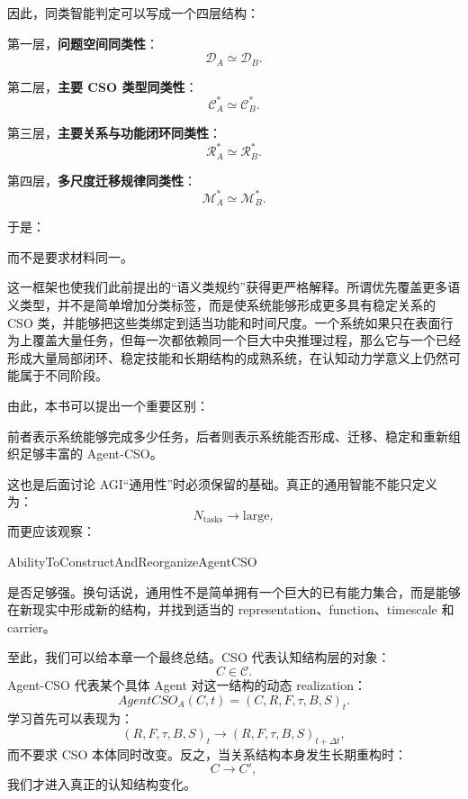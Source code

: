 因此，同类智能判定可以写成一个四层结构：

第一层，\textbf{问题空间同类性}：
\[
\mathcal D_A
\simeq
\mathcal D_B.
\]

第二层，\textbf{主要 CSO 类型同类性}：
\[
\mathcal C_A^\ast
\simeq
\mathcal C_B^\ast.
\]

第三层，\textbf{主要关系与功能闭环同类性}：
\[
\mathcal R_A^\ast
\simeq
\mathcal R_B^\ast.
\]

第四层，\textbf{多尺度迁移规律同类性}：
\[
\mathcal M_A^\ast
\simeq
\mathcal M_B^\ast.
\]

于是：
\begin{statementbox}
\centering
{}
\end{statementbox}
而不是要求材料同一。

这一框架也使我们此前提出的“语义类规约”获得更严格解释。所谓优先覆盖更多语义类型，并不是简单增加分类标签，而是使系统能够形成更多具有稳定关系的 CSO 类，并能够把这些类绑定到适当功能和时间尺度。一个系统如果只在表面行为上覆盖大量任务，但每一次都依赖同一个巨大中央推理过程，那么它与一个已经形成大量局部闭环、稳定技能和长期结构的成熟系统，在认知动力学意义上仍然可能属于不同阶段。

由此，本书可以提出一个重要区别：
\begin{statementbox}
\centering
{}
\end{statementbox}
前者表示系统能够完成多少任务，后者则表示系统能否形成、迁移、稳定和重新组织足够丰富的 Agent-CSO。

这也是后面讨论 AGI“通用性”时必须保留的基础。真正的通用智能不能只定义为：
\[
N_{\text{tasks}}\rightarrow\text{large},
\]
而更应该观察：
\begin{statementbox}
AbilityToConstructAndReorganizeAgentCSO
\end{statementbox}
是否足够强。换句话说，通用性不是简单拥有一个巨大的已有能力集合，而是能够在新现实中形成新的结构，并找到适当的 representation、function、timescale 和 carrier。

至此，我们可以给本章一个最终总结。CSO 代表认知结构层的对象：
\[
C\in\mathcal C.
\]
Agent-CSO 代表某个具体 Agent 对这一结构的动态 realization：
\[
AgentCSO_A(C,t)
=
(C,R,F,\tau,B,S)_t.
\]
学习首先可以表现为：
\[
(R,F,\tau,B,S)_t
\rightarrow
(R,F,\tau,B,S)_{t+\Delta t},
\]
而不要求 CSO 本体同时改变。反之，当关系结构本身发生长期重构时：
\[
C
\rightarrow
C',
\]
我们才进入真正的认知结构变化。

